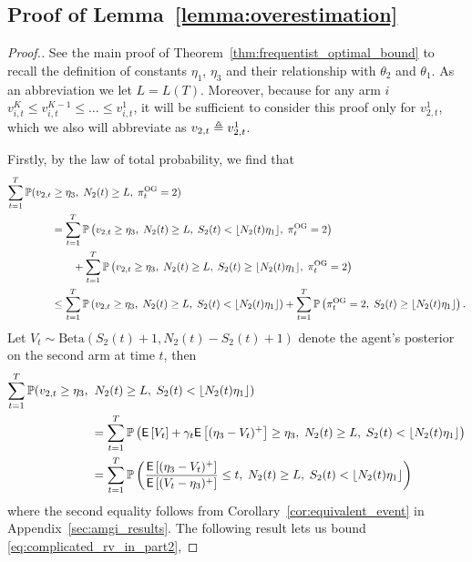 \subsection{Proof of Lemma~\ref{lemma:overestimation}} \label{proof:overestimation_proof}

\begin{proof}[Proof.]
	See the main proof of Theorem~\ref{thm:frequentist_optimal_bound} to recall the definition of constants $\eta_1$, $\eta_3$ and their relationship with $\theta_2$ and $\theta_1$. As an abbreviation we let $L = L(T)$. Moreover, because for any arm $i$ $v^K_{i,t} \le v^{K-1}_{i,t} \le \ldots \le v^1_{i,t}$, it will be sufficient to consider this proof only for $v^1_{2,t}$, which we also will abbreviate as $v_{2,t} \triangleq v^1_{2,t}$.
	
	Firstly, by the law of total probability, we find that
	\begin{align} 
	\sum_{t=1}^T \mathbb{P}(v_{2,t} & \ge \eta_3 ,\; N_2(t) \ge L,\; \pi^{\rm OG}_t = 2) \nonumber \\
	& = \sum_{t=1}^T \mathbb{P} \left( v_{2,t} \ge \eta_3 ,\; N_2(t) \ge L, \; S_2(t) < \lfloor N_2(t) \eta_1\rfloor, \; \pi^{\rm OG}_t = 2 \right) \nonumber \\
	& \qquad + \sum_{t=1}^T \mathbb{P} \left( v_{2,t} \ge \eta_3 ,\; N_2(t) \ge L, \; S_2(t) \ge \lfloor N_2(t) \eta_1\rfloor,\; \pi^{\rm OG}_t = 2 \right) \nonumber \\
	& \le \sum_{t=1}^T \mathbb{P} \left( v_{2,t} \ge \eta_3 ,\; N_2(t) \ge L, \; S_2(t) < \lfloor N_2(t) \eta_1\rfloor \right) + \sum_{t=1}^T \mathbb{P} \left( \pi^{\rm OG}_t = 2,\; S_2(t) \ge \lfloor N_2(t) \eta_1\rfloor \right) \label{eqn:splitting_not_underestimate}.
	\end{align}
	Let $V_t \sim \text{Beta}(S_2(t) + 1, N_2(t)- S_2(t) + 1)$ denote the agent's posterior on the second arm at time $t$, then
	\begin{align}
	\sum_{t=1}^T \mathbb{P}(v_{2,t} \ge \eta_3 ,\; & \; N_2(t) \ge L,\; S_2(t) < \lfloor N_2(t) \eta_1\rfloor)  \nonumber\\
	& = \sum_{t=1}^T \mathbb{P} \left( \mathsf{E} \left[ V_t \right] + \gamma_t \mathsf{E} \left[ (\eta_3 - V_t)^+ \right] \ge \eta_3, \; N_2(t) \ge L,\; S_2(t) < \lfloor N_2(t) \eta_1\rfloor \right) \nonumber \\
	& = \sum_{t=1}^T \mathbb{P} \left( \frac{\mathsf{E} \left[ (\eta_3-V_t)^+  \right]}{  \mathsf{E} \left[ (V_t - \eta_3)^+  \right]} \le t , \; N_2(t) \ge L,\; S_2(t) < \lfloor N_2(t) \eta_1\rfloor \right) \label{eq:complicated_rv_in_part2}
	\end{align}
	where the second equality follows from Corollary~\ref{cor:equivalent_event} in Appendix~\ref{sec:amgi_results}. The following result lets us bound \eqref{eq:complicated_rv_in_part2},

\end{proof}
